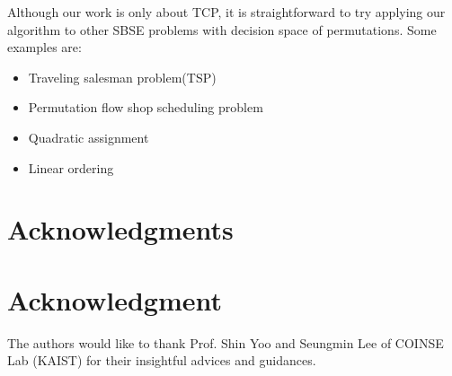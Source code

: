 \documentclass[10pt,journal,compsoc]{IEEEtran}
\begin{document}
	Although our work is only about TCP, it is straightforward to try applying our algorithm to other SBSE problems with decision space of permutations. Some examples are:
	\begin{itemize}
		\item Traveling salesman problem(TSP)
		
		\item Permutation flow shop scheduling problem
		
		\item Quadratic assignment
		
		\item Linear ordering
	\end{itemize}
	
	
	
	\ifCLASSOPTIONcompsoc
	\section*{Acknowledgments}
	\else
	\section*{Acknowledgment}
	\fi
	
	
	The authors would like to thank Prof. Shin Yoo and Seungmin Lee of COINSE Lab (KAIST) for their insightful advices and guidances.
	
	
	\ifCLASSOPTIONcaptionsoff
	\newpage
	\fi
	
	
	
	
	
	
	
	
\end{document}
